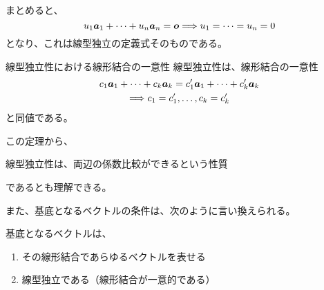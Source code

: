 \documentclass[../../../topic_linear-algebra]{subfiles}
\begin{document}
\br

まとめると、
\begin{equation*}
  u_1 \vb*{a}_1 + \cdots + u_n \vb*{a}_n = \vb*{o} \Longrightarrow u_1 = \cdots = u_n = 0
\end{equation*}
となり、これは線型独立の定義式そのものである。

\begin{theorem}{線型独立性における線形結合の一意性}\label{thm:lin-indep-iff-unique-lincomb}
  線型独立性は、線形結合の一意性
  \begin{gather*}
    c_1 \vb*{a}_1 + \cdots + c_k \vb*{a}_k = c'_1 \vb*{a}_1 + \cdots + c'_k \vb*{a}_k \\ \Longrightarrow c_1 = c'_1, \dots, c_k = c'_k
  \end{gather*}
  と同値である。
\end{theorem}

この定理から、
\begin{emphabox}
  \begin{spacebox}
    \begin{center}
      線型独立性は、両辺の係数比較ができるという性質
    \end{center}
  \end{spacebox}
\end{emphabox}
であるとも理解できる。

\br

また、基底となるベクトルの条件は、次のように言い換えられる。

\begin{emphabox}
  \begin{spacebox}
    基底となるベクトルは、
    \begin{enumerate}[label=\romanlabel]
      \item その線形結合であらゆるベクトルを表せる
      \item 線型独立である（線形結合が一意的である）
    \end{enumerate}
  \end{spacebox}
\end{emphabox}
\end{document}
